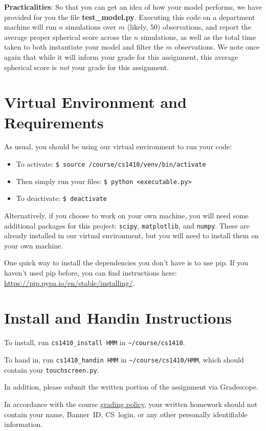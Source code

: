 \documentclass{article}
\begin{document}
\textbf{Practicalities}: So that you can get an idea of how your model
performs, we have provided for you the file \textbf{test\_model.py}.
Executing this code on a department machine will run $n$ simulations
over $m$ (likely, 50) observations, and report the average proper
spherical score across the $n$ simulations, as well as the total time
taken to both instantiate your model and filter the $m$ observations.
We note once again that while it will inform your grade for this
assignment, this average spherical score is \emph{not\/} your grade
for this assignment.


\section{Virtual Environment and Requirements}
As usual, you should be using our virtual environment to run your code:
\begin{itemize}
\setlength\itemsep{0em}

\item[] To activate: \texttt{\$ source /course/cs1410/venv/bin/activate}

\item[] Then simply run your files: \texttt{\$ python <executable.py>}

\item[] To deactivate: \texttt{\$ deactivate}
\end{itemize}
    
Alternatively, if you choose to work on your own machine, you will
need some additional packages for this project: \texttt{scipy},
\texttt{matplotlib}, and \texttt{numpy}. These are already installed
in our virtual environment, but you will need to install them on your
own machine.
    
One quick way to install the dependencies you don't have is to use
pip. If you haven't used pip before, you can find instructions here:
\url{https://pip.pypa.io/en/stable/installing/}.


\section{Install and Handin Instructions}
To install, run \verb|cs1410_install HMM| in \verb|~/course/cs1410|.

To hand in, run \verb|cs1410_handin HMM| in \verb|~/course/cs1410/HMM|,
which should contain your \verb|touchscreen.py|.

In addition, please submit the written portion of the assignment via Gradescope.

In accordance with the course \href{https://forms.gle/DqfbBY8jdaqenRoa9}{grading policy}, your
written homework should not contain your name, Banner~ID, CS~login, or any other personally
identifiable information.
\end{document}
